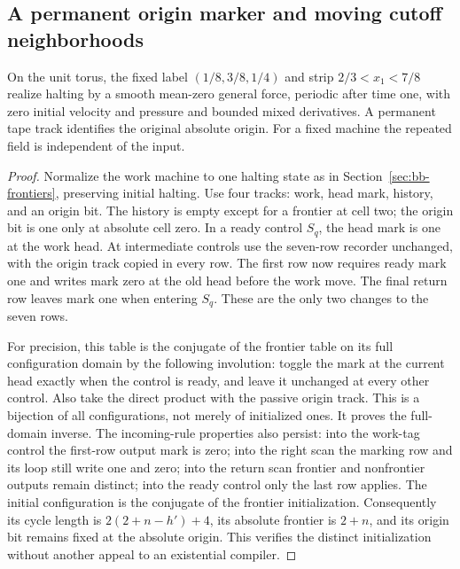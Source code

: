 \subsection{A permanent origin marker and moving cutoff neighborhoods}
\label{bc:height-separated-section}
\begin{theorem}
\label{bc:height-separated-event}
On the unit torus, the fixed label $(1/8,3/8,1/4)$ and strip
$2/3<x_1<7/8$ realize halting by a smooth mean-zero general force,
periodic after time one, with zero initial velocity and pressure and bounded
mixed derivatives. A permanent tape track identifies the original absolute
origin. For a fixed machine the repeated field is independent of the input.
\end{theorem}
\begin{proof}\label{bc:height-separated-event-proof}
Normalize the work machine to one halting state as in
Section~\ref{sec:bb-frontiers}, preserving initial halting.
Use four tracks: work, head mark, history, and an origin bit. The history
is empty except for a frontier at cell two; the origin bit is one only
at absolute cell zero. In a ready control $S_q$, the head mark is one
at the work head. At intermediate controls use the seven-row recorder
unchanged, with the origin track copied in every row. The first row now
requires ready mark one and writes mark zero at the old head before the
work move. The final return row leaves mark one when entering $S_q$.
These are the only two changes to the seven rows.

For precision, this table is the conjugate of the frontier table on its
full configuration domain by the following involution: toggle the mark
at the current head exactly when the control is ready, and leave it
unchanged at every other control. Also take the direct product with the
passive origin track. This is a bijection of all configurations, not merely
of initialized ones. It proves the full-domain inverse. The incoming-rule
properties also persist: into the work-tag control the first-row output
mark is zero; into the right scan the marking row and its loop still write
one and zero; into the return scan frontier and nonfrontier outputs remain
distinct; into the ready control only the last row applies. The initial
configuration is the conjugate of the frontier initialization. Consequently
its cycle length is $2(2+n-h')+4$, its absolute frontier is $2+n$, and
its origin bit remains fixed at the absolute origin. This verifies the
distinct initialization without another appeal to an existential compiler.


\end{proof}
